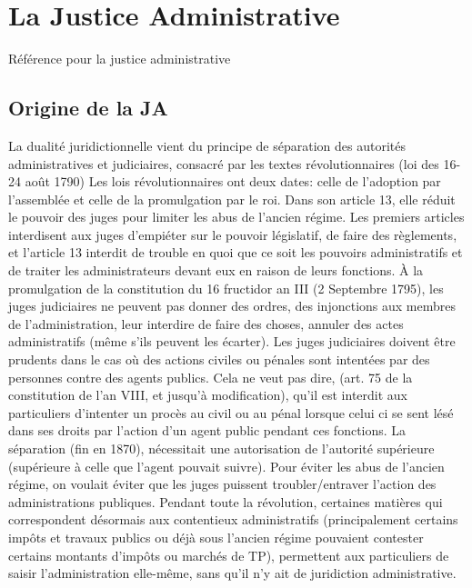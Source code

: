 \documentclass[math]{cours}
\begin{document}
\section{La Justice Administrative}
Référence pour la justice administrative \cite{seillerAD}

\subsection{Origine de la JA}
La dualité juridictionnelle vient du principe de séparation des autorités administratives et judiciaires, consacré par les textes révolutionnaires (loi des 16-24 août 1790)
Les lois révolutionnaires ont deux dates: celle de l'adoption par l'assemblée et celle de la promulgation par le roi.
Dans son article 13, elle réduit le pouvoir des juges pour limiter les abus de l'ancien régime.
Les premiers articles interdisent aux juges d'empiéter sur le pouvoir législatif, de faire des règlements, et l'article 13 interdit de trouble en quoi que ce soit les pouvoirs administratifs et de traiter les administrateurs devant eux en raison de leurs fonctions.
À la promulgation de la constitution du 16 fructidor an III (2 Septembre 1795), les juges judiciaires ne peuvent pas donner des ordres, des injonctions aux membres de l'administration, leur interdire de faire des choses, annuler des actes administratifs (même s'ils peuvent les écarter).
Les juges judiciaires doivent être prudents dans le cas où des actions civiles ou pénales sont intentées par des personnes contre des agents publics.
Cela ne veut pas dire, (art. 75 de la constitution de l'an VIII, et jusqu'à modification), qu'il est interdit aux particuliers d'intenter un procès au civil ou au pénal lorsque celui ci se sent lésé dans ses droits par l'action d'un agent public pendant ces fonctions.
La séparation (fin en 1870), nécessitait une autorisation de l'autorité supérieure (supérieure à celle que l'agent pouvait suivre).
Pour éviter les abus de l'ancien régime, on voulait éviter que les juges puissent troubler/entraver l'action des administrations publiques.
Pendant toute la révolution, certaines matières qui correspondent désormais aux contentieux administratifs (principalement certains impôts et travaux publics ou déjà sous l'ancien régime pouvaient contester certains montants d'impôts ou marchés de TP), permettent aux particuliers de saisir l'administration elle-même, sans qu'il n'y ait de juridiction administrative.
\end{document}
